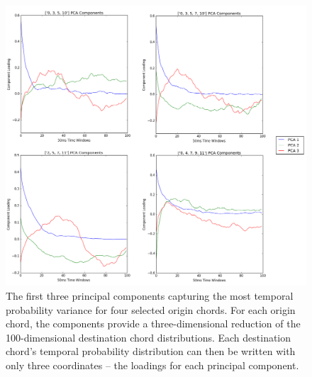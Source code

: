 \begin{figure}
	\centering
	\includegraphics[width=6in]{top200_PCA.png}
	\caption{The first three principal components capturing the most temporal probability variance for four selected origin chords.  For each origin chord, the components provide a three-dimensional reduction of the 100-dimensional destination chord distributions.  Each destination chord's temporal probability distribution can then be written with only three coordinates -- the loadings for each principal component.}
	\label{PCA_examples}
\end{figure}


